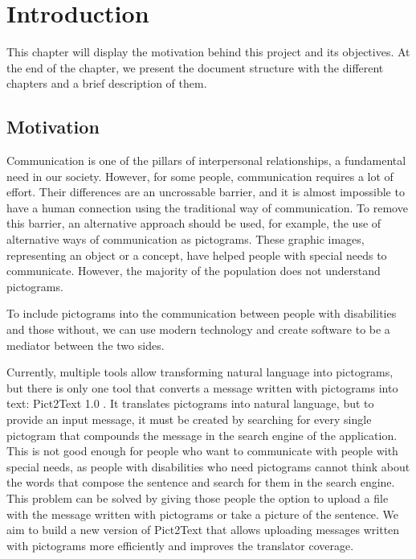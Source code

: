 
\chapter{Introduction}
\label{cap:introduction}

This chapter will display the motivation behind this project and its objectives. At the end of the chapter, we present the document structure with the different chapters and a brief description of them.

\section{Motivation}
\label{Motivation}

Communication is one of the pillars of interpersonal relationships, a fundamental need in our society. However, for some people, communication requires a lot of effort. Their differences are an uncrossable barrier, and it is almost impossible to have a human connection using the traditional way of communication. To remove this barrier, an alternative approach should be used, for example, the use of alternative ways of communication as pictograms. These graphic images, representing an object or a concept, have helped people with special needs to communicate. However, the majority of the population does not understand pictograms.

To include pictograms into the communication between people with disabilities and those without, we can use modern technology and create software to be a mediator between the two sides.

Currently, multiple tools allow transforming natural language into pictograms, but there is only one tool that converts a message written with pictograms into text: Pict2Text 1.0 \citep{pictText}. It translates pictograms into natural language, but to provide an input message, it must be created by searching for every single pictogram that compounds the message in the search engine of the application. This is not good enough for people who want to communicate with people with special needs, as people with disabilities who need pictograms cannot think about the words that compose the sentence and search for them in the search engine. This problem can be solved by giving those people the option to upload a file with the message written with pictograms or take a picture of the sentence. We aim to build a new version of Pict2Text that allows uploading messages written with pictograms more efficiently and improves the translator coverage.

